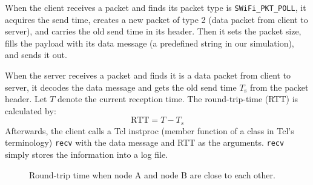 \documentclass{article}
\begin{document}
When the client receives a packet and finds its packet type is
\lstinline|SWiFi_PKT_POLL|, it acquires the send time, creates a new packet of
type 2 (data packet from client to server), and carries the old send time in its
header. Then it sets the packet size, fills the payload with its data message
(a predefined string in our simulation), and sends it out.

When the server receives a packet and finds it is a data packet from client to
server, it decodes the data message and gets the old send time $T_\text{s}$ from
the packet header. Let $T$ denote the current reception time. The
round-trip-time (RTT) is calculated by:
\begin{equation}
	\text{RTT} = T - T_s
\end{equation}
Afterwards, the client calls a Tcl instproc (member function of a class
in Tcl's terminology) \lstinline|recv| with the data message and RTT as the
arguments. \lstinline|recv| simply stores the information into a log file.

\begin{figure}[h]
\centering
{}
\caption{Round-trip time when node A and node B are close to each other.}
\end{figure}
\end{document}
